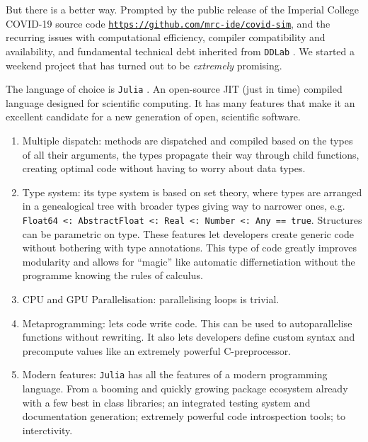 But there is a better way. Prompted by the public release of the Imperial College COVID-19 source code \href{https://github.com/mrc-ide/covid-sim}{\texttt{https://github.com/mrc-ide/covid-sim}}, and the recurring issues with computational efficiency, compiler compatibility and availability, and fundamental technical debt inherited from \texttt{DDLab} \cite{ddlab}. We started a weekend project that has turned out to be \emph{extremely} promising.

The language of choice is \texttt{Julia} \cite{julia}. An open-source JIT (just in time) compiled language designed for scientific computing. It has many features that make it an excellent candidate for a new generation of open, scientific software.
\begin{enumerate}
    \item Multiple dispatch: methods are dispatched and compiled based on the types of all their arguments, the types propagate their way through child functions, creating optimal code without having to worry about data types.
    \item Type system: its type system is based on set theory, where types are arranged in a genealogical tree with broader types giving way to narrower ones, e.g. \texttt{Float64 <: AbstractFloat <: Real <: Number <: Any == true}. Structures can be parametric on type. These features let developers create generic code without bothering with type annotations. This type of code greatly improves modularity and allows for ``magic'' like automatic differnetiation without the programme knowing the rules of calculus.
    \item CPU and GPU Parallelisation: parallelising loops is trivial.
    \item Metaprogramming: lets code write code. This can be used to autoparallelise functions without rewriting. It also lets developers define custom syntax and precompute values like an extremely powerful C-preprocessor.
    \item Modern features: \texttt{Julia} has all the features of a modern programming language. From a booming and quickly growing package ecosystem already with a few best in class libraries; an integrated testing system and documentation generation; extremely powerful code introspection tools; to interctivity.
\end{enumerate}


